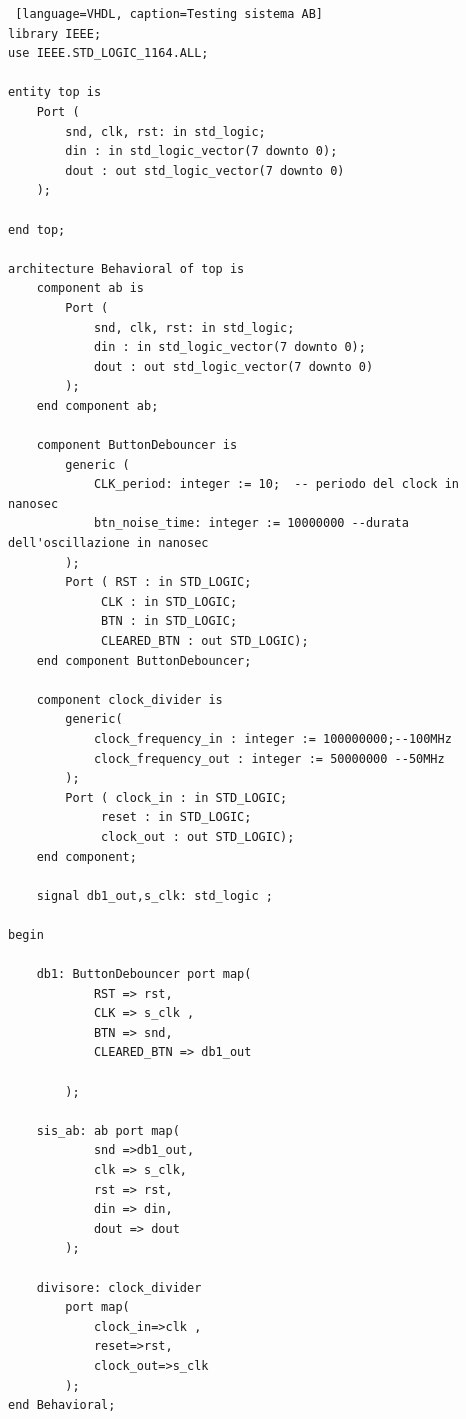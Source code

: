 \begin{lstlisting} [language=VHDL, caption=Testing sistema AB]
library IEEE;
use IEEE.STD_LOGIC_1164.ALL;

entity top is
    Port (
        snd, clk, rst: in std_logic;
        din : in std_logic_vector(7 downto 0);
        dout : out std_logic_vector(7 downto 0)
    );

end top;

architecture Behavioral of top is
    component ab is
        Port (
            snd, clk, rst: in std_logic;
            din : in std_logic_vector(7 downto 0);
            dout : out std_logic_vector(7 downto 0)
        );
    end component ab;

    component ButtonDebouncer is
        generic (
            CLK_period: integer := 10;  -- periodo del clock in nanosec
            btn_noise_time: integer := 10000000 --durata dell'oscillazione in nanosec
        );
        Port ( RST : in STD_LOGIC;
             CLK : in STD_LOGIC;
             BTN : in STD_LOGIC;
             CLEARED_BTN : out STD_LOGIC);
    end component ButtonDebouncer;

    component clock_divider is
        generic(
            clock_frequency_in : integer := 100000000;--100MHz
            clock_frequency_out : integer := 50000000 --50MHz
        );
        Port ( clock_in : in STD_LOGIC;
             reset : in STD_LOGIC;
             clock_out : out STD_LOGIC);
    end component;

    signal db1_out,s_clk: std_logic ;

begin

    db1: ButtonDebouncer port map(
            RST => rst,
            CLK => s_clk ,
            BTN => snd,
            CLEARED_BTN => db1_out

        );

    sis_ab: ab port map(
            snd =>db1_out,
            clk => s_clk,
            rst => rst,
            din => din,
            dout => dout
        );

    divisore: clock_divider
        port map(
            clock_in=>clk ,
            reset=>rst,
            clock_out=>s_clk
        );
end Behavioral;
\end{lstlisting}

















